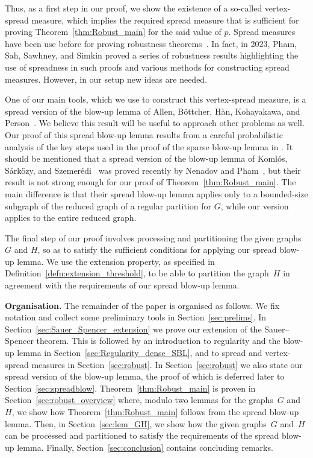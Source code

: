 \documentclass[final]{article}
\theoremstyle{definition}
\begin{document}
Thus, as a first step in our proof, we show the existence of a so-called vertex-spread measure, which implies the required spread measure that is sufficient for proving Theorem~\ref{thm:Robust_main}
for the said value of $p$. 
Spread measures have been use before for proving robustness
theorems~\cite{nenadov_pham_spreadblowup, Alp_robustness_spread}. In
fact, in 2023, Pham, Sah, Sawhney, and Simkin
\cite{toolkit_robust_thresholds} proved a series of robustness results
highlighting the use of spreadness in such proofs and various methods
for constructing spread measures. However, in our setup new ideas are needed.

One of our main tools, which we use to construct this vertex-spread measure,
is a spread version of the blow-up lemma of Allen, B\"ottcher, H\`an,
Kohayakawa, and Person~\cite{sparse_blowup}. We believe this result
will be useful to approach other problems as well.
%
%
Our proof of this spread blow-up lemma results from a careful
probabilistic analysis of the key steps used in the proof of the
sparse blow-up lemma in \cite{sparse_blowup}. It should be mentioned that a spread version of the blow-up lemma of
Koml\'os, S\'ark\"ozy, and Szemer\'edi~\cite{Blowup_lemma} was proved
recently by Nenadov and Pham~\cite{nenadov_pham_spreadblowup}, but
their result is not strong enough for our proof of
Theorem~\ref{thm:Robust_main}. The main difference is that their spread blow-up lemma applies only to a bounded-size subgraph of the reduced graph of a regular partition for $G$, while our version applies to the entire reduced graph. 

The final step of our proof involves processing and
partitioning the given graphs $G$ and $H$, so as to satisfy the
sufficient conditions for applying our spread blow-up lemma. We use the extension property, as specified in
Definition~\ref{defn:extension_threshold}, to be able to partition the
graph~$H$ in agreement with the requirements of our spread blow-up
lemma.

\noindent \textbf{Organisation.} The remainder of the paper is organised as follows. We fix notation and collect some preliminary tools in Section~\ref{sec:prelims}. In Section~\ref{sec:Sauer_Spencer_extension} we prove our extension of the Sauer--Spencer theorem. This is followed by an introduction to regularity and the blow-up lemma in Section~\ref{sec:Regularity_dense_SBL}, and to spread and vertex-spread measures in Section~\ref{sec:robust}. In Section~\ref{sec:robust} we also state our spread version of the blow-up lemma, the proof of which is deferred later to Section~\ref{sec:spreadblow}. Theorem~\ref{thm:Robust_main} is proven in Section~\ref{sec:robust_overview} where, modulo two lemmas for the graphs~$G$ and~$H$, we show how Theorem~\ref{thm:Robust_main} follows from the spread blow-up lemma. Then, in Section~\ref{sec:lem_GH}, we show how the given graphs~$G$ and~$H$ can be processed and partitioned to satisfy the requirements of the spread blow-up lemma. Finally, Section~\ref{sec:conclusion} contains concluding remarks.
\end{document}
